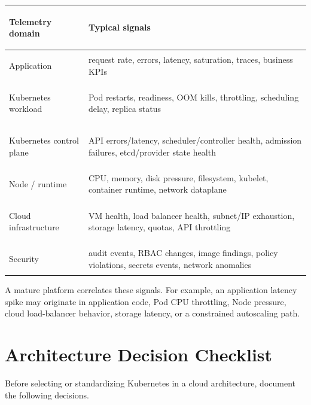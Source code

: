 \documentclass[11pt]{article}
\begin{document}
\begin{table}[ht]
\centering
\small
\begin{tabularx}{\textwidth}{>{\bfseries\raggedright\arraybackslash}p{3.1cm} >{\raggedright\arraybackslash}X}
\toprule
Telemetry domain & Typical signals \\
\midrule
Application & request rate, errors, latency, saturation, traces, business KPIs \\
Kubernetes workload & Pod restarts, readiness, OOM kills, throttling, scheduling delay, replica status \\
Kubernetes control plane & API errors/latency, scheduler/controller health, admission failures, etcd/provider state health \\
Node / runtime & CPU, memory, disk pressure, filesystem, kubelet, container runtime, network dataplane \\
Cloud infrastructure & VM health, load balancer health, subnet/IP exhaustion, storage latency, quotas, API throttling \\
Security & audit events, RBAC changes, image findings, policy violations, secrets events, network anomalies \\
\bottomrule
\end{tabularx}
\end{table}

A mature platform correlates these signals. For example, an application latency spike may originate in application code, Pod CPU throttling, Node pressure, cloud load-balancer behavior, storage latency, or a constrained autoscaling path.

\section{Architecture Decision Checklist}

Before selecting or standardizing Kubernetes in a cloud architecture, document the following decisions.
\end{document}
